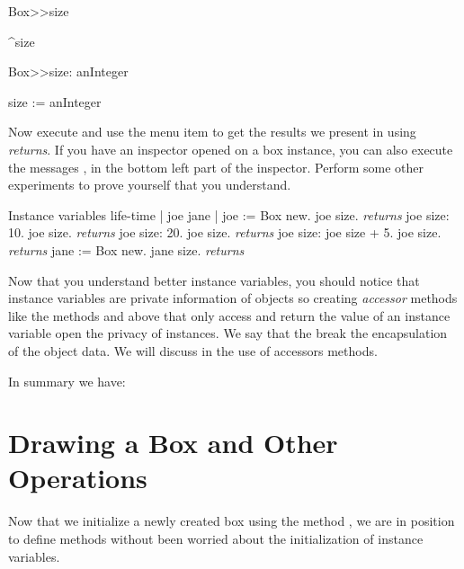 


\begin{method}\label{mt:size}
Box>>size

   ^size
\end{method}

\begin{method}\label{mt:sizeAssign}
Box>>size: anInteger

   size := anInteger
\end{method}


Now execute  and use the menu item
 to get the results we present in   using \emph{returns}. If you have an inspector opened
on a box instance, you can also execute the messages ,  in the bottom left part of the inspector. Perform some other experiments to prove yourself that you understand.

\begin{scriptwithtitle}{Instance variables 
life-time}\label{scr:instanceVarLife}
| joe jane |
joe := Box new.
joe size. \emph{returns} 
joe size: 10.
joe size. \emph{returns} 
joe size: 20.
joe size. \emph{returns} 
joe size: joe size + 5.
joe size. \emph{returns} 
jane := Box new.
jane size. \emph{returns} 
\end{scriptwithtitle}


Now that you understand better instance variables, you should notice that instance variables are private information of objects so creating \emph{accessor} methods like the methods and  above that only access and return the value of an instance variable open the privacy of instances. We say that the break the encapsulation of the object data. We will discuss in  the use of accessors methods.

In summary we have: 



\section{Drawing a Box and Other Operations}
Now that we initialize a newly created box using the method
, we are in position to define methods without been
worried about the initialization of instance variables.  

